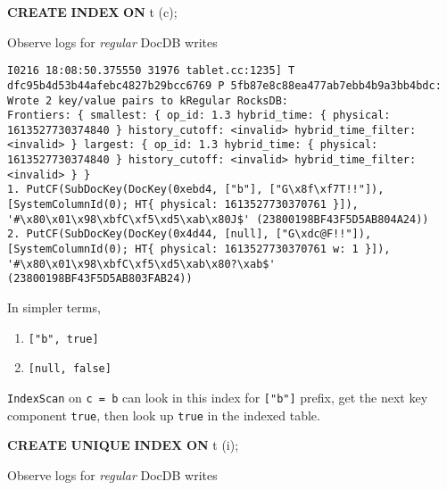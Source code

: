\documentclass[
]{article}
\newenvironment{Shaded}{}{}
\newcommand{\KeywordTok}[1]{\textcolor[rgb]{0.00,0.44,0.13}{\textbf{#1}}}
\newcommand{\NormalTok}[1]{#1}
\providecommand{\tightlist}{%
  \setlength{\itemsep}{0pt}\setlength{\parskip}{0pt}}
\begin{document}
\begin{Shaded}
\begin{Highlighting}[]
\KeywordTok{CREATE} \KeywordTok{INDEX} \KeywordTok{ON}\NormalTok{ t (c);}
\end{Highlighting}
\end{Shaded}

Observe logs for \emph{regular} DocDB writes

\begin{verbatim}
I0216 18:08:50.375550 31976 tablet.cc:1235] T dfc95b4d53b44afebc4827b29bcc6769 P 5fb87e8c88ea477ab7ebb4b9a3bb4bdc: Wrote 2 key/value pairs to kRegular RocksDB:
Frontiers: { smallest: { op_id: 1.3 hybrid_time: { physical: 1613527730374840 } history_cutoff: <invalid> hybrid_time_filter: <invalid> } largest: { op_id: 1.3 hybrid_time: { physical: 1613527730374840 } history_cutoff: <invalid> hybrid_time_filter: <invalid> } }
1. PutCF(SubDocKey(DocKey(0xebd4, ["b"], ["G\x8f\xf7T!!"]), [SystemColumnId(0); HT{ physical: 1613527730370761 }]), '#\x80\x01\x98\xbfC\xf5\xd5\xab\x80J$' (23800198BF43F5D5AB804A24))
2. PutCF(SubDocKey(DocKey(0x4d44, [null], ["G\xdc@F!!"]), [SystemColumnId(0); HT{ physical: 1613527730370761 w: 1 }]), '#\x80\x01\x98\xbfC\xf5\xd5\xab\x80?\xab$' (23800198BF43F5D5AB803FAB24))
\end{verbatim}

In simpler terms,

\begin{enumerate}
\def\labelenumi{\arabic{enumi}.}
\tightlist
\item
  \texttt{{[}"b",\ true{]}}
\item
  \texttt{{[}null,\ false{]}}
\end{enumerate}

\texttt{IndexScan} on
\texttt{c\ =\ \textquotesingle{}b\textquotesingle{}} can look in this
index for \texttt{{[}"b"{]}} prefix, get the next key component
\texttt{true}, then look up \texttt{true} in the indexed table.

\begin{Shaded}
\begin{Highlighting}[]
\KeywordTok{CREATE} \KeywordTok{UNIQUE} \KeywordTok{INDEX} \KeywordTok{ON}\NormalTok{ t (i);}
\end{Highlighting}
\end{Shaded}

Observe logs for \emph{regular} DocDB writes
\end{document}
